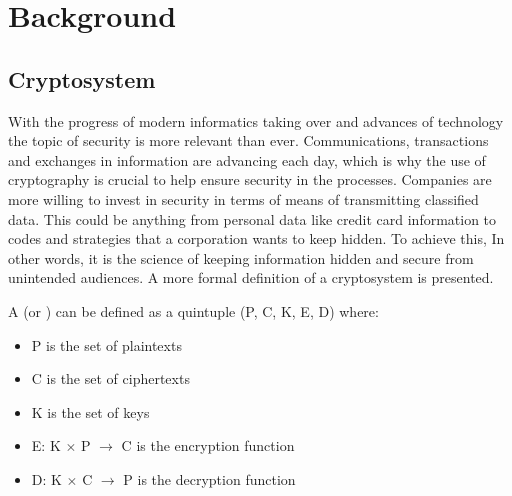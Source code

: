 

\chapter{Background} %

\textcolor{Cite the references you used at appropriate places}

\newcommand{\keyword}[1]{\textbf{#1}}
\newcommand{\tabhead}[1]{\textbf{#1}}
\newcommand{\code}[1]{\texttt{#1}}
\newcommand{\file}[1]{\texttt{\bfseries#1}}
\newcommand{\option}[1]{\texttt{\itshape#1}}

\section{Cryptosystem}
\hspace{10mm} 
With the progress of modern informatics taking over and advances of technology the topic of security is more relevant than ever. Communications, transactions and exchanges in information are advancing each day, which is why the use of cryptography is crucial to help ensure security in the processes. Companies are more willing to invest in security in terms of means of transmitting classified data. This could be anything from personal data like credit card information to codes and strategies that a corporation wants to keep hidden. To achieve this,  In other words, it is the science of keeping information hidden and secure from unintended audiences. A more formal definition of a cryptosystem is presented.

\begin{definition}
    A  (or ) can be defined as a quintuple (P, C, K, E, D)  where: 
        \begin{itemize}
            \item P is the set of plaintexts
            \item C is the set of ciphertexts
            \item K is the set of keys
            \item E: K $\times$ P $\rightarrow$ C is the encryption function 
            \item D: K $\times$ C $\rightarrow$ P is the decryption function 
        \end{itemize}
\end{definition}

